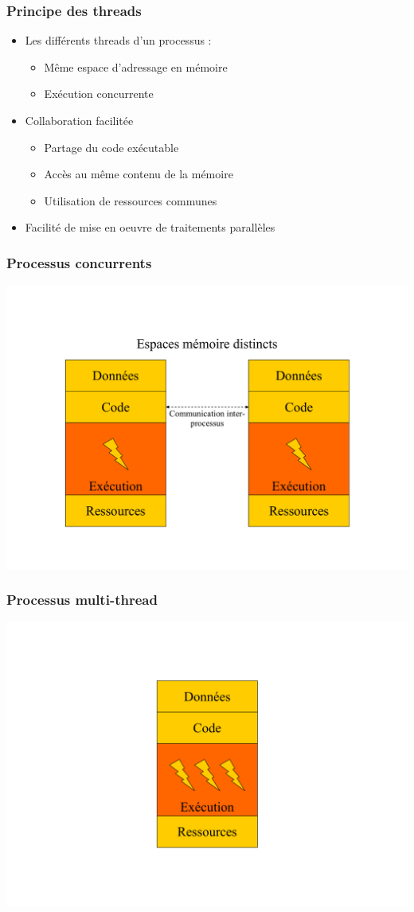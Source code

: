 \begin{frame}
 \frametitle{Principe des threads}
 \begin{itemize}
 \item Les différents threads d’un processus :
 \begin{itemize}
 \item Même espace d'adressage en mémoire
 \item Exécution concurrente
\end{itemize}
\item Collaboration facilitée
\begin{itemize}
 \item Partage du code exécutable
 \item Accès au même contenu de la mémoire
 \item Utilisation de ressources communes
 \end{itemize}
 \item Facilité de mise en oeuvre de traitements parallèles
 \end{itemize}
\end{frame}



\begin{frame}
 \frametitle{Processus concurrents}
 \includegraphics[width=.8\textwidth]{../illustration/processus_concurrents.pdf}
\end{frame}


\begin{frame}
 \frametitle{Processus multi-thread}
 \includegraphics[width=.5\textheight]{../illustration/processus_multithread.pdf}
\end{frame}


